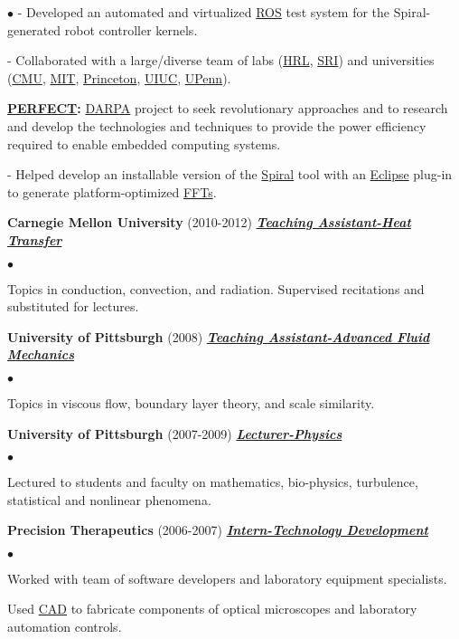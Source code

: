 \documentclass{article}
\newcommand{\employer}[3]{{ \textbf{#1} (#2) \underline{\textbf{\emph{#3}}}\\  }}
\newenvironment{achievements}{\begin{list}{$\bullet$}{\topsep 0pt \itemsep -2pt}}{\vspace*{4pt}\end{list}}
\begin{document}
\begin{achievements}
- Developed an automated and virtualized \href{http://www.ros.org/}{ROS} test system for the Spiral-generated robot controller kernels.  

- Collaborated with a large/diverse team of labs (\href{http://www.hrl.com/}{HRL}, \href{http://www.sri.com/}{SRI}) and universities (\href{http://www.cmu.edu/}{CMU}, \href{http://web.mit.edu/}{MIT}, \href{http://www.princeton.edu/}{Princeton}, \href{http://illinois.edu/}{UIUC}, \href{http://www.upenn.edu/}{UPenn}). 

\item \textbf{\href{http://www.darpa.mil/Our_Work/MTO/Programs/Power_Efficiency_Revolution_for_Embedded_Computing_Technologies_(PERFECT).aspx}{PERFECT}:}
\href{http://www.darpa.mil/default.aspx}{DARPA} project to seek revolutionary approaches and to research and develop the technologies and techniques to provide the power efficiency required to enable embedded computing systems. 

- Helped develop an installable version of the \href{http://spiral.net/}{Spiral} tool with an \href{http://www.eclipse.org/}{Eclipse} plug-in to generate platform-optimized \href{http://en.wikipedia.org/wiki/Fast_Fourier_transform}{FFTs}. 
\end{achievements}

\employer{Carnegie Mellon University}{2010-2012}{Teaching Assistant-Heat Transfer}
	\begin{achievements}
	\item Topics in conduction, convection, and radiation. Supervised recitations and substituted for lectures. 
	\end{achievements}

\employer{University of Pittsburgh}{2008}{Teaching Assistant-Advanced Fluid Mechanics}
	\begin{achievements}
	\item Topics in viscous flow, boundary layer theory, and scale similarity. 
	\end{achievements}

\employer{University of Pittsburgh}{2007-2009}{Lecturer-Physics}
	\begin{achievements}
	\item Lectured to students and faculty on mathematics, bio-physics, turbulence, statistical and nonlinear phenomena. 
	\end{achievements}

\employer{Precision Therapeutics}{2006-2007}{Intern-Technology Development}
	\begin{achievements}
	\item Worked with team of software developers and laboratory equipment specialists.
	\item Used \href{http://en.wikipedia.org/wiki/Computer-aided_design}{CAD} to fabricate components of optical microscopes and laboratory automation controls. 
	\end{achievements}
\end{document}
